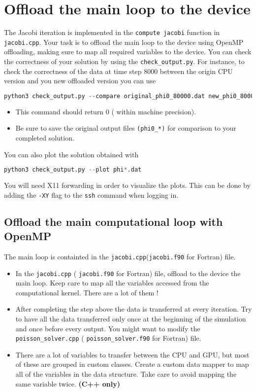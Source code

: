 \documentclass{article}
\begin{document}
\section{Offload the main loop to the device}

The Jacobi iteration is implemented in the \texttt{compute jacobi} function in \texttt{jacobi.cpp}.
Your task is to offload the main loop to the device using OpenMP offloading, making sure to map all required variables to the device.
You can check the correctness of your solution by using the \texttt{check\_output.py}. For instance, to check the correctness  of the data at time step 8000 between the origin CPU version and you new offloaded version you can use

\begin{lstlisting}[language=Python]
python3 check_output.py --compare original_phi0_80000.dat new_phi0_80000.dat
\end{lstlisting}

\begin{itemize}
    \item This command should return $0$ ( within machine precision).
    \item Be sure to save the original output files \texttt{(phi0\_*)} for comparison to your completed solution. 
\end{itemize}

You can also plot the solution obtained with 
\begin{lstlisting}[language=Python]
python3 check_output.py --plot phi*.dat
\end{lstlisting}

You will need X11 forwarding in order to visualize the plots. This can be done by adding the \texttt{-XY} flag to the \texttt{ssh} command when logging in.

\subsection{Offload the main computational loop with OpenMP}
The main loop is containted in the \texttt{jacobi.cpp}(\texttt{jacobi.f90} for Fortran) file.
\begin{itemize}
    \item In the \texttt{jacobi.cpp} ( \texttt{jacobi.f90} for Fortran) file, offload to the device the main loop. Keep care to map all the variables accessed from the computational kernel. There are a lot of them !
    \item After completing the step above the data is transferred at every iteration. Try to have all the data transferred only once at the beginning of the simulation and once before every output. You might want to modify the \texttt{poisson\_solver.cpp} ( \texttt{poisson\_solver.f90} for Fortran) file.
    \item There are a lot of variables to transfer between the CPU and GPU, but most of these are grouped in custom classes. Create a custom data mapper to map all of the variables in the data structure. Take care to avoid mapping the same variable twice.  \textbf{(C++ only)}
    
\end{itemize}
    
\end{document}
